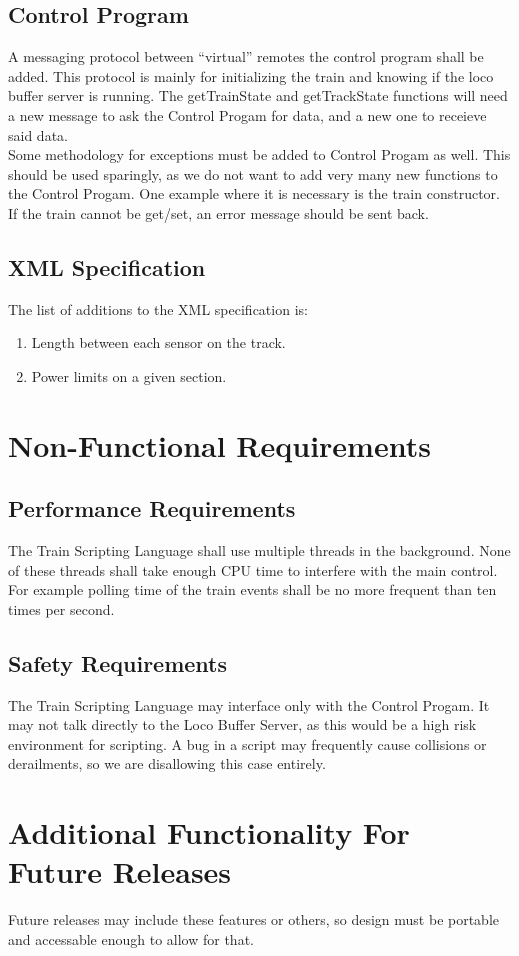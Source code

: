 \documentclass[a4paper,11pt,notitlepage]{article}
\def\TSL{Train Scripting Language\xspace}
\def\CS{Control Progam\xspace}
\begin{document}
\subsection{Control Program}
    A messaging protocol between ``virtual'' remotes the control program shall be added.  This protocol is mainly for initializing the train and knowing if the loco buffer server is running. The getTrainState and getTrackState functions will need a new message to ask the \CS for data, and a new one to receieve said data.
    \\Some methodology for exceptions must be added to \CS as well. This should be used sparingly, as we do not want to add very many new functions to the \CS. One example where it is necessary is the train constructor. If the train cannot be get/set, an error message should be sent back.
\subsection{XML Specification}
    The list of additions to the XML specification is:
\begin{enumerate}
    \item Length between each sensor on the track.
    \item Power limits on a given section.
\end{enumerate}

\newpage
\section{Non-Functional Requirements}
\subsection{Performance Requirements}
The \TSL shall use multiple threads in the background. None of these threads shall take enough CPU time to interfere with the main control. For example polling time of the train events shall be no more frequent than ten times per second.
\subsection{Safety Requirements}
The \TSL may interface only with the \CS. It may not talk directly to the Loco Buffer Server, as this would be a high risk environment for scripting. A bug in a script may frequently cause collisions or derailments, so we are disallowing this case entirely.

\newpage
\section{Additional Functionality For Future Releases}
Future releases may include these features or others, so design must be portable and accessable enough to allow for that.
\end{document}
